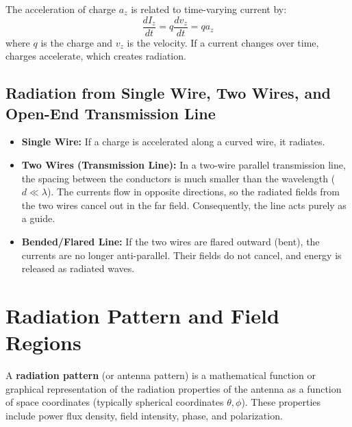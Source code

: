\documentclass[12pt,a4paper]{article}
\begin{document}
The acceleration of charge $a_z$ is related to time-varying current by:
\[
\frac{dI_z}{dt} = q \frac{dv_z}{dt} = q a_z
\]
where $q$ is the charge and $v_z$ is the velocity. If a current changes over time, charges accelerate, which creates radiation. 

\subsection{Radiation from Single Wire, Two Wires, and Open-End Transmission Line}
\begin{itemize}[leftmargin=*, itemsep=3pt]
  \item \textbf{Single Wire:} If a charge is accelerated along a curved wire, it radiates.
  \item \textbf{Two Wires (Transmission Line):} In a two-wire parallel transmission line, the spacing between the conductors is much smaller than the wavelength ($d \ll \lambda$). The currents flow in opposite directions, so the radiated fields from the two wires cancel out in the far field. Consequently, the line acts purely as a guide.
  \item \textbf{Bended/Flared Line:} If the two wires are flared outward (bent), the currents are no longer anti-parallel. Their fields do not cancel, and energy is released as radiated waves.
\end{itemize}

\section{Radiation Pattern and Field Regions}

\begin{tcolorbox}[defbox, title={\textbf{Definition of Radiation Pattern}}]
A \textbf{radiation pattern} (or antenna pattern) is a mathematical function or graphical representation of the radiation properties of the antenna as a function of space coordinates (typically spherical coordinates $\theta, \phi$). These properties include power flux density, field intensity, phase, and polarization.
\end{tcolorbox}
\end{document}
